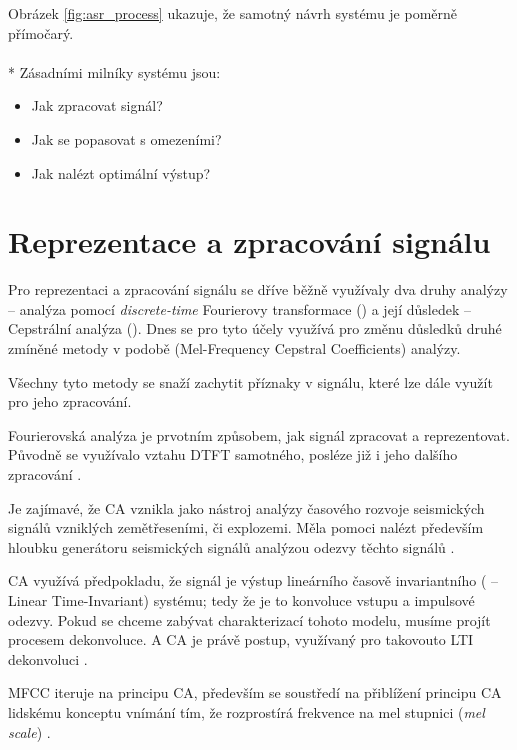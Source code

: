 Obrázek \ref{fig:asr_process} ukazuje, že samotný návrh systému je poměrně přímočarý.
\\\\*
Zásadními milníky systému jsou:

\begin{itemize}
\item Jak zpracovat signál?
\item Jak se popasovat s omezeními?
\item Jak nalézt optimální výstup?
\end{itemize}

\section{Reprezentace a zpracování signálu}

Pro reprezentaci a zpracování signálu se dříve běžně využívaly dva druhy analýzy -- analýza pomocí {\sl discrete-time} Fourierovy transformace () a její důsledek -- Cepstrální analýza (). Dnes se pro tyto účely využívá pro změnu důsledků druhé zmíněné metody v podobě  (Mel-Frequency Cepstral Coefficients) analýzy.

Všechny tyto metody se snaží zachytit příznaky v signálu, které lze dále využít pro jeho zpracování.

Fourierovská analýza je prvotním způsobem, jak signál zpracovat a reprezentovat. Původně se využívalo vztahu DTFT samotného, posléze již i jeho dalšího zpracování \cite{shaug_2003}.

Je zajímavé, že CA vznikla jako nástroj analýzy časového rozvoje seismických signálů vzniklých zemětřeseními, či explozemi. Měla pomoci nalézt především hloubku generátoru seismických signálů analýzou odezvy těchto signálů \cite{bogert_1963}.

CA využívá předpokladu, že signál je výstup lineárního časově invariantního ( -- Linear Time-Invariant) systému; tedy že je to konvoluce vstupu a impulsové odezvy. Pokud se chceme zabývat charakterizací tohoto modelu, musíme projít procesem dekonvoluce. A CA je právě postup, využívaný pro takovouto LTI dekonvoluci \cite{tohkura_1987}.

MFCC iteruje na principu CA, především se soustředí na přiblížení principu CA lidskému konceptu vnímání tím, že rozprostírá frekvence na mel stupnici ({\sl mel scale}) \cite{hossan_2010}.

